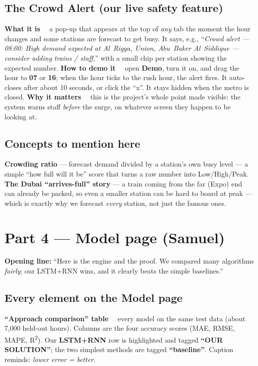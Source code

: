\documentclass[11pt]{article}
\newcommand{\term}[1]{\noindent\textbf{\color{ink}#1} --- }
\newcommand{\elem}[1]{\smallskip\noindent\textbf{\color{metroRed}#1}\ \ }
\begin{document}
\subsection{The Crowd Alert (our live safety feature)}
\elem{What it is} a pop-up that appears at the top of \emph{any} tab the moment the hour changes and
some stations are forecast to get busy. It says, e.g., ``\emph{Crowd alert --- 08:00: High demand
expected at Al~Rigga, Union, Abu~Baker Al~Siddique --- consider adding trains / staff},'' with a small
chip per station showing the expected number.
\elem{How to demo it} open \textbf{Demo}, turn it on, and drag the hour to \textbf{07} or \textbf{16};
when the hour ticks to the rush hour, the alert fires. It auto-closes after about 10 seconds, or click
the ``x''. It stays hidden when the metro is closed.
\elem{Why it matters} this is the project's whole point made visible: the system warns staff
\emph{before} the surge, on whatever screen they happen to be looking at.

\subsection{Concepts to mention here}
\term{Crowding ratio} forecast demand divided by a station's own busy level --- a simple ``how full
will it be'' score that turns a raw number into Low/High/Peak.
\term{The Dubai ``arrives-full'' story} a train coming from the far (Expo) end can already be packed,
so even a smaller station can be hard to board at peak --- which is exactly why we forecast
\emph{every} station, not just the famous ones.

\section{Part 4 --- Model page \textnormal{(Samuel)}}
\textbf{Opening line:} ``Here is the engine and the proof. We compared many algorithms \emph{fairly};
our LSTM+RNN wins, and it clearly beats the simple baselines.''

\subsection{Every element on the Model page}
\elem{``Approach comparison'' table} every model on the same test data (about 7{,}000 held-out
hours). Columns are the four accuracy scores (MAE, RMSE, MAPE, R\textsuperscript{2}). Our
\textbf{LSTM+RNN} row is highlighted and tagged \textbf{``OUR SOLUTION''}; the two simplest methods are
tagged \textbf{``baseline''}. Caption reminds: \emph{lower error = better}.
\end{document}
